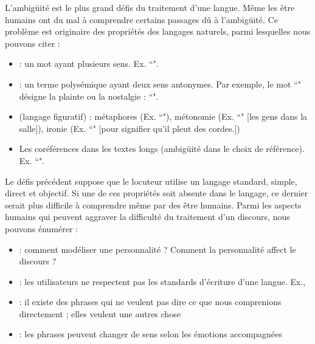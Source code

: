 \documentclass{KodeBook}
\begin{document}
L'ambigüité est le plus grand défis du traitement d'une langue. 
Même les être humains ont du mal à comprendre certains passages dû à l'ambigüité.
Ce problème est originaire des propriétés des langages naturels, parmi lesquelles nous pouvons citer :
\begin{itemize}
	\item {} : un mot ayant plusieurs sens. Ex. ``".
	\item {} : un terme polysémique ayant deux sens antonymes. Par exemple, le mot ``" désigne la plainte ou la nostalgie : ``".
	\item {} (langage figuratif) : métaphores (Ex. ``"), métonomie (Ex. ``" [les gens dans la salle]), ironie (Ex. ``" [pour signifier qu'il pleut des cordes.])
	\item Les coréférences dans les textes longs (ambigüité dans le choix de référence). 
	Ex. ``".
\end{itemize}

Le défis précédent suppose que le locuteur utilise un langage standard, simple, direct et objectif.
Si une de ces propriétés soit absente dans le langage, ce dernier serait plus difficile à comprendre même par des être humains.
Parmi les aspects humains qui peuvent aggraver la difficulté du traitement d'un discours, nous pouvons énumérer :
\begin{itemize}
	\item {} : comment modéliser une personnalité ? Comment la personnalité affect le discours ?
	\item {} : les utilisateurs ne respectent pas les standards d'écriture d'une langue. Ex., 
	\item {} : il existe des phrases qui ne veulent pas dire ce que nous comprenions directement ; elles veulent une autres chose
	\item {} : les phrases peuvent changer de sens selon les émotions accompagnées
\end{itemize}
\end{document}
